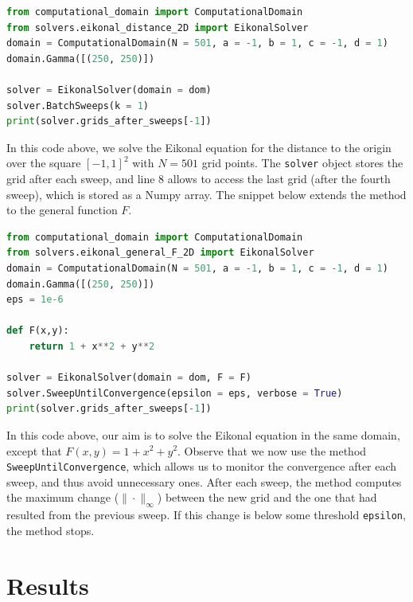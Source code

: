 \documentclass[11pt]{article}
\theoremstyle{definition}
\theoremstyle{remark}
\begin{document}
\begin{lstlisting}[language=Python, caption = Instance of an Eikonal Solver for the 2D distance function]
from computational_domain import ComputationalDomain
from solvers.eikonal_distance_2D import EikonalSolver
domain = ComputationalDomain(N = 501, a = -1, b = 1, c = -1, d = 1)
domain.Gamma([(250, 250)])

solver = EikonalSolver(domain = dom)
solver.BatchSweeps(k = 1)
print(solver.grids_after_sweeps[-1])
\end{lstlisting} 

\noindent In this code above, we solve the Eikonal equation for the distance to the origin over the square $[-1,1]^2$ with $N=501$ grid points. The \texttt{solver} object stores the grid after each sweep, and line 8 allows to access the last grid (after the fourth sweep), which is stored as a Numpy array. The snippet below extends the method to the general function $F$. \\

\begin{lstlisting}[language=Python, caption = Instance of an Eikonal Solver for a general velocity F]
from computational_domain import ComputationalDomain
from solvers.eikonal_general_F_2D import EikonalSolver
domain = ComputationalDomain(N = 501, a = -1, b = 1, c = -1, d = 1)
domain.Gamma([(250, 250)])
eps = 1e-6

def F(x,y):
    return 1 + x**2 + y**2

solver = EikonalSolver(domain = dom, F = F)
solver.SweepUntilConvergence(epsilon = eps, verbose = True)
print(solver.grids_after_sweeps[-1])
\end{lstlisting}

\noindent In this code above, our aim is to solve the Eikonal equation in the same domain, except that $F(x,y)=1+x^2+y^2$. Observe that we now use the method \texttt{SweepUntilConvergence}, which allows us to monitor the convergence after each sweep, and thus avoid unnecessary ones. After each sweep, the method computes the maximum change ($\|\cdot\|_\infty$) between the new grid and the one that had resulted from the previous sweep. If this change is below some threshold \texttt{epsilon}, the method stops. 

\section{Results}
\end{document}
